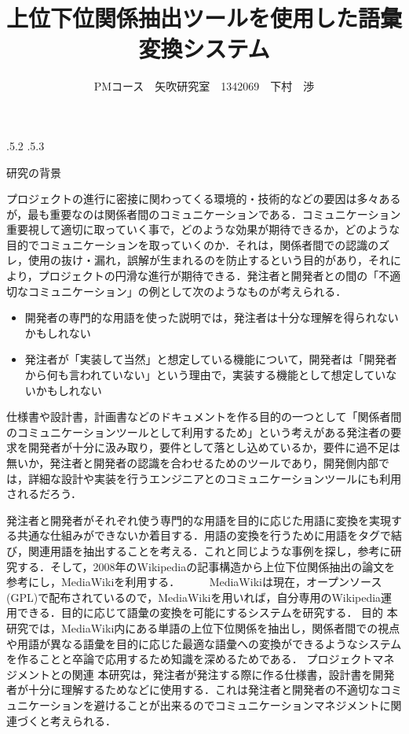 \documentclass[uplatex]{jsarticle}
\title{\vspace{-14mm}上位下位関係抽出ツールを使用した語彙変換システム}
\author{PMコース　矢吹研究室　1342069　下村　渉}
\date{}%
\makeatletter
\renewcommand{\section}{%
    \if@slide\clearpage\fi
    \@startsection{section}{1}{\z@}%
    {\Cvs \@plus.5\Cdp \@minus.2\Cdp}%
    {.5\Cvs \@plus.3\Cdp}%
    {\normalfont\raggedright}}
\makeatother
\begin{document}
\maketitle





\section{研究の背景}

プロジェクトの進行に密接に関わってくる環境的・技術的などの要因は多々あるが，最も重要なのは関係者間のコミュニケーションである．コミュニケーション重要視して適切に取っていく事で，どのような効果が期待できるか，どのような目的でコミュニケーションを取っていくのか．それは，関係者間での認識のズレ，使用の抜け・漏れ，誤解が生まれるのを防止するという目的があり，それにより，プロジェクトの円滑な進行が期待できる．発注者と開発者との間の「不適切なコミュニケーション」の例として次のようなものが考えられる．
\begin{itemize}
  \item 開発者の専門的な用語を使った説明では，発注者は十分な理解を得られないかもしれない
  \item 発注者が「実装して当然」と想定している機能について，開発者は「開発者から何も言われていない」という理由で，実装する機能として想定していないかもしれない
  \end{itemize}

仕様書や設計書，計画書などのドキュメントを作る目的の一つとして「関係者間のコミュニケーションツールとして利用するため」という考えがある発注者の要求を開発者が十分に汲み取り，要件として落とし込めているか，要件に過不足は無いか，発注者と開発者の認識を合わせるためのツールであり，開発側内部では，詳細な設計や実装を行うエンジニアとのコミュニケーションツールにも利用されるだろう\cite{a}．

発注者と開発者がそれぞれ使う専門的な用語を目的に応じた用語に変換を実現する共通な仕組みができないか着目する．用語の変換を行うために用語をタグで結び，関連用語を抽出することを考える．これと同じような事例を探し，参考に研究する．そして，2008年のWikipediaの記事構造から上位下位関係抽出の論文を参考にし，MediaWikiを利用する．\cite{b}
　
　MediaWikiは現在，オープンソース(GPL)で配布されているので，MediaWikiを用いれば，自分専用のWikipedia運用できる\cite{c}．目的に応じて語彙の変換を可能にするシステムを研究する．
目的
本研究では，MediaWiki内にある単語の上位下位関係を抽出し，関係者間での視点や用語が異なる語彙を目的に応じた最適な語彙への変換ができるようなシステムを作ることと卒論で応用するため知識を深めるためである．
プロジェクトマネジメントとの関連
本研究は，発注者が発注する際に作る仕様書，設計書を開発者が十分に理解するためなどに使用する．これは発注者と開発者の不適切なコミュニケーションを避けることが出来るのでコミュニケーションマネジメントに関連づくと考えられる．
\end{document}

